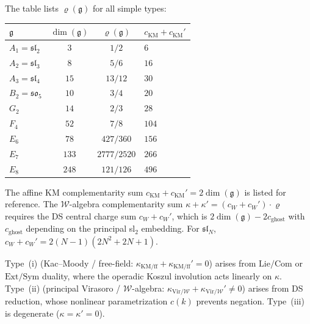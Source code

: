 \begin{computation}
\label{comp:complementarity-classical}
The table lists $\varrho(\mathfrak{g})$ for all simple types:
\begin{center}
\renewcommand{\arraystretch}{1.3}
\begin{tabular}{lccl}
\toprule
$\mathfrak{g}$ & $\dim(\mathfrak{g})$ & $\varrho(\mathfrak{g})$ & $c_{\mathrm{KM}} + c_{\mathrm{KM}}'$ \\
\midrule
$A_1 = \mathfrak{sl}_2$ & $3$ & $1/2$ & $6$ \\
$A_2 = \mathfrak{sl}_3$ & $8$ & $5/6$ & $16$ \\
$A_3 = \mathfrak{sl}_4$ & $15$ & $13/12$ & $30$ \\
$B_2 = \mathfrak{so}_5$ & $10$ & $3/4$ & $20$ \\
$G_2$ & $14$ & $2/3$ & $28$ \\
$F_4$ & $52$ & $7/8$ & $104$ \\
$E_6$ & $78$ & $427/360$ & $156$ \\
$E_7$ & $133$ & $2777/2520$ & $266$ \\
$E_8$ & $248$ & $121/126$ & $496$ \\
\bottomrule
\end{tabular}
\end{center}
The affine KM complementarity sum $c_{\mathrm{KM}} + c_{\mathrm{KM}}' = 2\dim(\mathfrak{g})$ is listed for reference. The $\mathcal{W}$-algebra complementarity sum $\kappa + \kappa' = (c_W + c_W') \cdot \varrho$ requires the DS central charge sum $c_W + c_W'$, which is $2\dim(\mathfrak{g}) - 2c_{\mathrm{ghost}}$ with $c_{\mathrm{ghost}}$ depending on the principal sl$_2$ embedding. For $\mathfrak{sl}_N$, $c_W + c_W' = 2(N-1)(2N^2+2N+1)$.
\end{computation}

\begin{remark}
\label{rem:complementarity-operadic}
Type~(i) (Kac--Moody / free-field: $\kappa_{\mathrm{KM/ff}} + \kappa_{\mathrm{KM/ff}}' = 0$) arises from $\mathrm{Lie}/\mathrm{Com}$ or $\mathrm{Ext}/\mathrm{Sym}$ duality, where the operadic Koszul involution acts linearly on $\kappa$. Type~(ii) (principal Virasoro / $\mathcal{W}$-algebra: $\kappa_{\mathrm{Vir}/\mathcal{W}} + \kappa_{\mathrm{Vir}/\mathcal{W}}' \neq 0$) arises from DS reduction, whose nonlinear parametrization $c(k)$ prevents negation. Type~(iii) is degenerate ($\kappa = \kappa' = 0$).
\end{remark}

